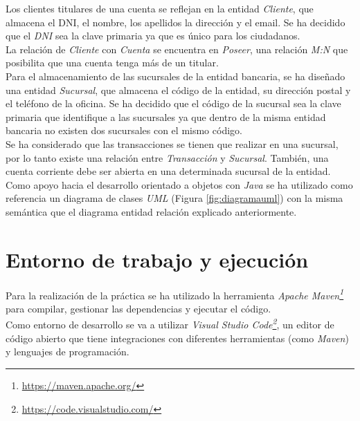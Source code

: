 \documentclass[11pt,a4paper]{article}
\begin{document}
Los clientes titulares de una cuenta se reflejan en la entidad \emph{Cliente}, que almacena el DNI, el nombre, los apellidos la dirección y el email. Se ha decidido que el \emph{DNI} sea la clave primaria ya que es único para los ciudadanos.\\
La relación de \emph{Cliente} con \emph{Cuenta} se encuentra en \emph{Poseer}, una relación \emph{M:N} que posibilita que una cuenta tenga más de un titular.\\
Para el almacenamiento de las sucursales de la entidad bancaria, se ha diseñado una entidad \emph{Sucursal}, que almacena el código de la entidad, su dirección postal y el teléfono de la oficina. Se ha decidido que el código de la sucursal sea la clave primaria que identifique a las sucursales ya que dentro de la misma entidad bancaria no existen dos sucursales con el mismo código.\\
Se ha considerado que las transacciones se tienen que realizar en una sucursal, por lo tanto existe una relación entre \emph{Transacción} y \emph{Sucursal}. También, una cuenta corriente debe ser abierta en una determinada sucursal de la entidad.\\

Como apoyo hacia el desarrollo orientado a objetos con \emph{Java} se ha utilizado como referencia un diagrama de clases \emph{UML} (Figura \ref{fig:diagramauml}) con la misma semántica que el diagrama entidad relación explicado anteriormente.\\


\section{Entorno de trabajo y ejecución}

Para la realización de la práctica se ha utilizado la herramienta \emph{Apache Maven\footnote{\url{https://maven.apache.org/}}} para compilar, gestionar las dependencias y ejecutar el código.\\
Como entorno de desarrollo se va a utilizar \emph{Visual Studio Code\footnote{\url{https://code.visualstudio.com/}}}, un editor de código abierto que tiene integraciones con diferentes herramientas (como \emph{Maven}) y lenguajes de programación.\\
\end{document}
